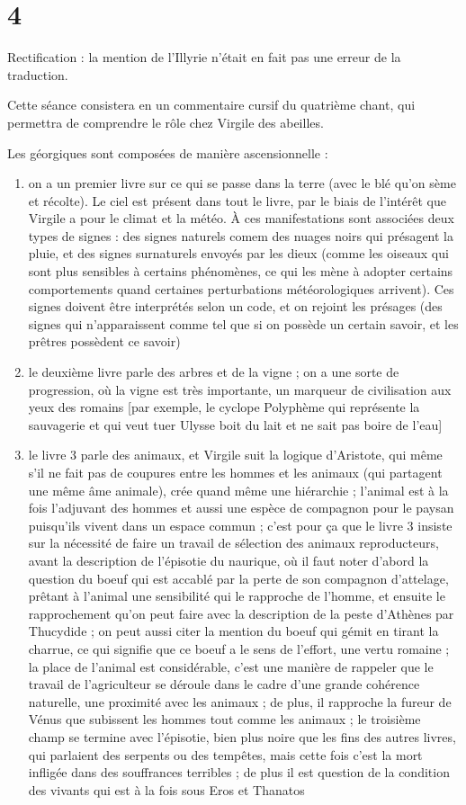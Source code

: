 \documentclass[a4paper,12pt]{book}
\begin{document}
\section{4}
\par Rectification : la mention de l'Illyrie n'était en fait pas une erreur de la traduction.

\par Cette séance consistera en un commentaire cursif du quatrième chant, qui permettra de comprendre le rôle chez Virgile des abeilles.
\par Les géorgiques sont composées de manière ascensionnelle :\begin{enumerate}
\item on a un premier livre sur ce qui se passe dans la terre (avec le blé qu'on sème et récolte). Le ciel est présent dans tout le livre, par le biais de l'intérêt que Virgile a pour le climat et la météo. À ces manifestations sont associées deux types de signes : des signes naturels comem des nuages noirs qui présagent la pluie, et des signes surnaturels envoyés par les dieux (comme les oiseaux qui sont plus sensibles à certains phénomènes, ce qui les mène à adopter certains comportements quand certaines perturbations météorologiques arrivent). Ces signes doivent être interprétés selon un code, et on rejoint les présages (des signes qui n'apparaissent comme tel que si on possède un certain savoir, et les prêtres possèdent ce savoir)
\item le deuxième livre  parle des arbres et de la vigne ; on a une sorte de progression, où la vigne est très importante, un marqueur de civilisation aux yeux des romains [par exemple, le cyclope Polyphème qui représente la sauvagerie et qui veut tuer Ulysse boit du lait et ne sait pas boire de l'eau]
\item le livre 3 parle des animaux, et Virgile suit la logique d'Aristote, qui même s'il ne fait pas de coupures entre les hommes et les animaux (qui partagent une même âme animale), crée quand même une hiérarchie ; l'animal est à la fois l'adjuvant des hommes et aussi une espèce de compagnon pour le paysan puisqu'ils vivent dans un espace commun ; c'est pour ça que le livre 3 insiste sur la nécessité de faire un travail de sélection des animaux reproducteurs, avant la description de l'épisotie du naurique, où il faut noter d'abord la question du boeuf qui est accablé par la perte de son compagnon d'attelage, prêtant à l'animal une sensibilité qui le rapproche de l'homme, et ensuite le rapprochement qu'on peut faire avec la description de la peste d'Athènes par Thucydide ; on peut aussi citer la mention du boeuf qui gémit en tirant la charrue, ce qui signifie que ce boeuf a le sens de l'effort, une vertu romaine ; la place de l'animal est considérable, c'est une manière de rappeler que le travail de l'agriculteur se déroule dans le cadre d'une grande cohérence naturelle, une proximité avec les animaux ; de plus, il rapproche la fureur de Vénus que subissent les hommes tout comme les animaux ; le troisième champ se termine avec l'épisotie, bien plus noire que les fins des autres livres, qui parlaient des serpents ou des tempêtes, mais cette fois c'est la mort infligée dans des souffrances terribles ; de plus il est question de la condition des vivants qui est à la fois sous Eros et Thanatos

\end{enumerate}
\end{document}
